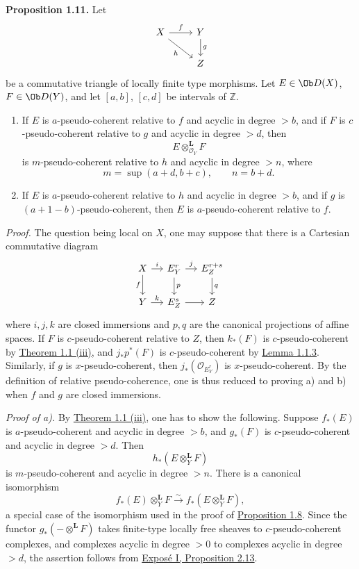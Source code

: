 \textbf{Proposition 1.11.} Let
\[
\begin{tikzcd}
X \arrow[r,"f"] \arrow[dr,"h"'] & Y \arrow[d,"g"]\\
& Z
\end{tikzcd}
\]
be a commutative triangle of locally finite type morphisms. Let \(E\in\Ob D(X)\), \(F\in\Ob D(Y)\), and let \([a,b]\), \([c,d]\) be intervals of \(\mathbb Z\).

\begin{enumerate}[label=\alph*)]
\item If \(E\) is \(a\)-pseudo-coherent relative to \(f\) and acyclic in degree \(>b\), and if \(F\) is \(c\)-pseudo-coherent relative to \(g\) and acyclic in degree \(>d\), then
\[
  E\otimes_{\mathcal O_Y}^{\mathbf L}F
\]
is \(m\)-pseudo-coherent relative to \(h\) and acyclic in degree \(>n\), where
\[
  m=\sup(a+d,b+c),\qquad n=b+d.
\]

\item If \(E\) is \(a\)-pseudo-coherent relative to \(h\) and acyclic in degree \(>b\), and if \(g\) is \((a+1-b)\)-pseudo-coherent, then \(E\) is \(a\)-pseudo-coherent relative to \(f\).
\end{enumerate}

\emph{Proof.} The question being local on \(X\), one may suppose that there is a Cartesian commutative diagram
\[
\begin{tikzcd}[column sep=small]
X \arrow[r,"i"] \arrow[d,"f"'] & E^r_Y \arrow[r,"j"] \arrow[d,"p"] & E^{r+s}_Z \arrow[d,"q"]\\
Y \arrow[r,"k"] & E^s_Z \arrow[r] & Z
\end{tikzcd}
\]
where \(i,j,k\) are closed immersions and \(p,q\) are the canonical projections of affine spaces. If \(F\) is \(c\)-pseudo-coherent relative to \(Z\), then \(k_*(F)\) is \(c\)-pseudo-coherent by \hyperlink{sga6.e03.thm.1-1}{Theorem 1.1 (iii)}, and \(j_*p^*(F)\) is \(c\)-pseudo-coherent by \hyperlink{sga6.e03.lem.1-1-3}{Lemma 1.1.3}. Similarly, if \(g\) is \(x\)-pseudo-coherent, then \(j_*(\mathcal O_{E^r_Y})\) is \(x\)-pseudo-coherent. By the definition of relative pseudo-coherence, one is thus reduced to proving a) and b) when \(f\) and \(g\) are closed immersions.

\emph{Proof of a).} By \hyperlink{sga6.e03.thm.1-1}{Theorem 1.1 (iii)}, one has to show the following. Suppose \(f_*(E)\) is \(a\)-pseudo-coherent and acyclic in degree \(>b\), and \(g_*(F)\) is \(c\)-pseudo-coherent and acyclic in degree \(>d\). Then
\[
  h_*(E\otimes_Y^{\mathbf L}F)
\]
is \(m\)-pseudo-coherent and acyclic in degree \(>n\). There is a canonical isomorphism
\[
  f_*(E)\otimes_Y^{\mathbf L}F\xrightarrow{\sim} f_*(E\otimes_Y^{\mathbf L}F),
\]
a special case of the isomorphism used in the proof of \hyperlink{sga6.e03.prop.1-8}{Proposition 1.8}. Since the functor \(g_*(-\otimes^{\mathbf L}F)\) takes finite-type locally free sheaves to \(c\)-pseudo-coherent complexes, and complexes acyclic in degree \(>0\) to complexes acyclic in degree \(>d\), the assertion follows from \hyperlink{sga6.e01.prop.2-13}{Exposé I, Proposition 2.13}.

